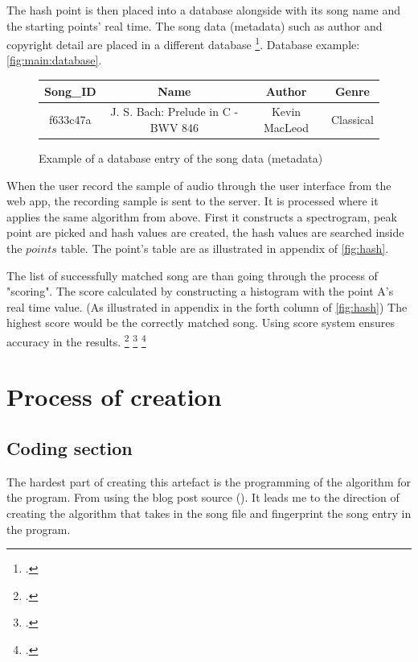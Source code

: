 The hash point is then placed into a database alongside with its song name and the starting points' real time. The song data (metadata) such as author and copyright detail are placed in a different database \footcite{macleod_abracadabra_2022}. Database example: \autoref{fig:main:database}.

\begin{figure}[h!]
    \centering
    \begin{tabular}{|c|c|c|c|}
        \hline
        Song\_ID & Name & Author & Genre \\
        \hline
        f633c47a & J. S. Bach: Prelude in C - BWV 846  & Kevin MacLeod & Classical \\
        \hline
    \end{tabular}
    \caption{Example of a database entry of the song data (metadata)}
    \label{fig:main:database}
\end{figure}

When the user record the sample of audio through the user interface from the web app, the recording sample is sent to the server. It is processed where it applies the same algorithm from above. First it constructs a spectrogram, peak point are picked and hash values are created, the hash values are searched inside the $points$ table. The point's table are as illustrated in appendix of \autoref{fig:hash}.

The list of successfully matched song are than going through the process of "scoring". The score calculated by constructing a histogram with the point A's real time value. (As illustrated in appendix in the forth column of \autoref{fig:hash}) The highest score would be the correctly matched song. Using score system ensures accuracy in the results. \footcite{wang_systems_2013}  \footcite{yang_music_2001} \footcite{wang_industrial-strength_2003}

\chapter{Process of creation}
\section{Coding section}
The hardest part of creating this artefact is the programming of the algorithm for the program. From using the blog post source (\cite{macleod_abracadabra_2022}). It leads me to the direction of creating the algorithm that takes in the song file and fingerprint the song entry in the program. 

